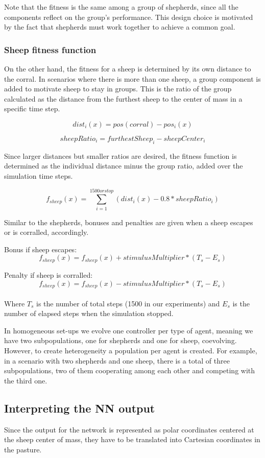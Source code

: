 \documentclass[conference]{IEEEtran}
\begin{document}
Note that the fitness is the same among a group of shepherds, since all the components reflect on the group's performance. This design choice is motivated by the fact that shepherds must work together to achieve a common goal. 

\subsubsection{Sheep fitness function}
On the other hand, the fitness for a sheep is determined by its own distance to the corral. In scenarios where there is more than one sheep, a group component is added to motivate sheep to stay in groups. This is the ratio of the group calculated as the distance from the furthest sheep to the center of mass in a specific time step. 

$$ dist_i(x) = pos(corral) - pos_i(x) $$

$$ sheepRatio_i = furthestSheep_i - sheepCenter_i $$

Since larger distances but smaller ratios are desired, the fitness function is determined as the individual distance minus the group ratio, added over the simulation time steps. 

$$ f_{sheep}(x) = \sum_{i=1}^{1500 or stop}(dist_i(x) - 0.8 * sheepRatio_i) $$

Similar to the shepherds, bonuses and penalties are given when a sheep escapes or is corralled, accordingly.  

Bonus if sheep escapes:
$$ f_{sheep}(x) = f_{sheep}(x) + stimulusMultiplier * (T_s - E_s) $$

Penalty if sheep is corralled:
$$ f_{sheep}(x) = f_{sheep}(x) - stimulusMultiplier * (T_s - E_s) $$\\
Where $T_s$ is the number of total steps (1500 in our experiments) and $E_s$ is the number of elapsed steps when the simulation stopped.

In homogeneous set-ups we evolve one controller per type of agent, meaning we have two subpopulations, one for shepherds and one for sheep, coevolving. However, to create heterogeneity a population per agent is created. For example, in a scenario with two shepherds and one sheep, there is a total of three subpopulations, two of them cooperating among each other and competing with the third one.  

\subsection{Interpreting the NN output}
Since the output for the network is represented as polar coordinates centered at the sheep center of mass, they have to be translated into Cartesian coordinates in the pasture. 
\end{document}
